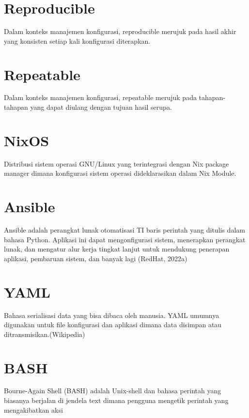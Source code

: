 \documentclass[10pt,twoside]{report}
\begin{document}
\section{Reproducible}
\begin{adjustwidth}{20pt}{}

	Dalam konteks manajemen konfigurasi, reproducible merujuk pada hasil akhir
	yang konsisten setiap kali konfigurasi diterapkan.
\end{adjustwidth}
\section{Repeatable}
\begin{adjustwidth}{20pt}{}

	Dalam konteks manajemen konfigurasi, repeatable merujuk pada tahapan-tahapan
	yang dapat diulang dengan tujuan hasil serupa.
\end{adjustwidth}
\section{NixOS}
\begin{adjustwidth}{20pt}{}

	Distribusi sistem operasi GNU/Linux yang terintegrasi dengan Nix package
	manager dimana konfigurasi sistem operasi dideklarasikan dalam Nix Module.
\end{adjustwidth}
\section{Ansible}
\begin{adjustwidth}{20pt}{}

	Ansible adalah perangkat lunak otomatisasi TI baris perintah yang ditulis dalam
	bahasa Python. Aplikasi ini dapat mengonfigurasi sistem, menerapkan perangkat
	lunak, dan mengatur alur kerja tingkat lanjut untuk mendukung penerapan
	aplikasi, pembaruan sistem, dan banyak lagi (RedHat, 2022a)
\end{adjustwidth}
\section{YAML}
\begin{adjustwidth}{20pt}{}

	Bahasa serialisasi data yang bisa dibaca oleh manusia. YAML umumnya digunakan
	untuk file konfigurasi dan aplikasi dimana data disimpan atau
	ditransmisikan.(Wikipedia)
\end{adjustwidth}
\section{BASH}
\begin{adjustwidth}{20pt}{}

	Bourne-Again Shell (BASH) adalah Unix-shell dan bahasa perintah yang biasanya
	berjalan di jendela text dimana pengguna mengetik perintah yang mengakibatkan
	aksi
\end{adjustwidth}
\end{document}
